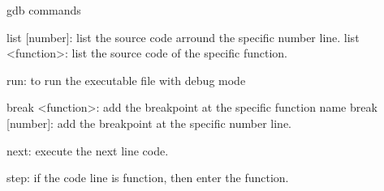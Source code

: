 gdb commands \begin{DoxyVerb}list [number]: list the source code arround the specific number line.
list <function>: list the source code of the specific function.

run: to run the executable file with debug mode

break <function>: add the breakpoint at the specific function name
break [number]: add the breakpoint at the specific number line.

next: execute the next line code.

step: if the code line is function, then enter the function.\end{DoxyVerb}
 